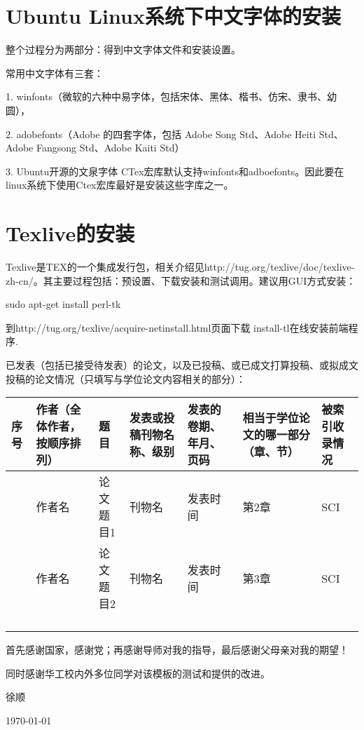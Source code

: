 \documentclass[unicode]{scutthesis}
\begin{document}



\pagestyle{appendix_style}

\section{Ubuntu Linux系统下中文字体的安装}
\label{sec:ubuntuzhfont}
整个过程分为两部分：得到中文字体文件和安装设置。

常用中文字体有三套：

1. winfonts（微软的六种中易字体，包括宋体、黑体、楷书、仿宋、隶书、幼圆），

2. adobefonts（Adobe 的四套字体，包括 Adobe Song Std、Adobe Heiti Std、Adobe
Fangsong Std、Adobe Kaiti Std）

3. Ubuntu开源的文泉字体
CTex宏库默认支持winfonts和adboefonts。因此要在linux系统下使用Ctex宏库最好是安装这些字库之一。

\section{Texlive的安装}

\label{sec:texlive_install}

Texlive是TEX的一个集成发行包，相关介绍见http://tug.org/texlive/doc/texlive-zh-cn/。其主要过程包括：预设置、下载安装和测试调用。建议用GUI方式安装：

sudo apt-get install perl-tk 

到http://tug.org/texlive/acquire-netinstall.html页面下载 install-tl在线安装前端程序.



已发表（包括已接受待发表）的论文，以及已投稿、或已成文打算投稿、或拟成文投稿的论文情况（只填写与学位论文内容相关的部分）：

\begin{table}
\begin{longtable}{|>{\centering}m{0.5cm}|>{\centering}m{2.3cm}|>{\centering}m{3.5cm}|>{\centering}m{2.6cm}|>{\centering}m{2cm}|>{\centering}m{1.3cm}|>{\centering}m{0.9cm}|}
\hline 
序号 & 作者（全体作者，按顺序排列） & 题 目 & 发表或投稿刊物名称、级别 & 发表的卷期、年月、页码 & 相当于学位论文的哪一部分（章、节） & 被索引收录情况\tabularnewline
\hline 
1 & 作者名 & 论文题目1 & 刊物名 & 发表时间 & 第2章 & SCI\tabularnewline
\hline 
2 & 作者名 & 论文题目2 & 刊物名 & 发表时间 & 第3章 & SCI\tabularnewline
\hline 
 &  &  &  &  &  & \tabularnewline
\hline 
 &  &  &  &  &  & \tabularnewline
\hline 
 &  &  &  &  &  & \tabularnewline
\hline 
 &  &  &  &  &  & \tabularnewline
\hline 
\end{longtable}
\end{table}




首先感谢国家，感谢党；再感谢导师对我的指导，最后感谢父母亲对我的期望！

同时感谢华工校内外多位同学对该模板的测试和提供的改进。

\begin{minipage}[t]{0.8\columnwidth}%
\begin{flushright}
徐顺 
\par\end{flushright}

\begin{flushright}
\today
\par\end{flushright}%
\end{minipage}
\end{document}
